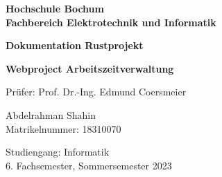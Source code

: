 \documentclass[1.5pt]{article}
\begin{document}

	\begin{titlepage}
		
		\hspace{\fill}\textbf{Hochschule Bochum}\\\hspace*{\fill}\textbf{Fachbereich Elektrotechnik und Informatik}
		
		\begin{center}
			\vspace*{\fill}
			\vspace{\fill}\textbf{\large Dokumentation Rustprojekt}
			
			\vspace{0.5cm}
			\textbf{\large\glqq Webproject Arbeitszeitverwaltung \grqq}\vspace{\fill}
			
		\end{center}
		
		\vspace{2cm}
		
		Prüfer: Prof. Dr.-Ing. Edmund Coersmeier
		
		\vspace{1cm}
		
		Abdelrahman Shahin\\
		Matrikelnummer: 18310070\\
		
		\vspace{0.5cm}
		
		Studiengang: Informatik\\
		6. Fachsemester, Sommersemester 2023
		
		
		
	\end{titlepage}
	
	\fancyfoot[C]{}
	
	
	
	\fancyfoot[C]{\thepage \ / \pageref{LetzteSeite}}
	
	
	\setcounter{tocdepth}{3}
	\tableofcontents
	\newpage
\end{document}
